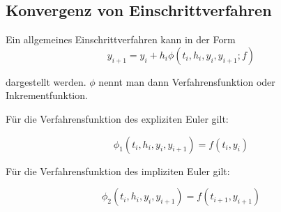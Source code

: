 \subsection{Konvergenz von Einschrittverfahren}

Ein allgemeines Einschrittverfahren kann in der Form 
$$y_{i+1} = y_i + h_i \phi (t_i, h_i, y_i, y_{i+1}; f)$$

dargestellt werden. $\phi$ nennt man dann Verfahrensfunktion oder Inkrementfunktion. 

\begin{example} Für die Verfahrensfunktion des expliziten Euler gilt:

	$$\phi_1(t_i, h_i, y_i, y_{i+1}) = f(t_i, y_i)$$
	
	Für die Verfahrensfunktion des impliziten Euler gilt:
	
	$$\phi_2(t_i, h_i, y_i, y_{i+1}) = f(t_{i+1}, y_{i+1})$$

\end{example}